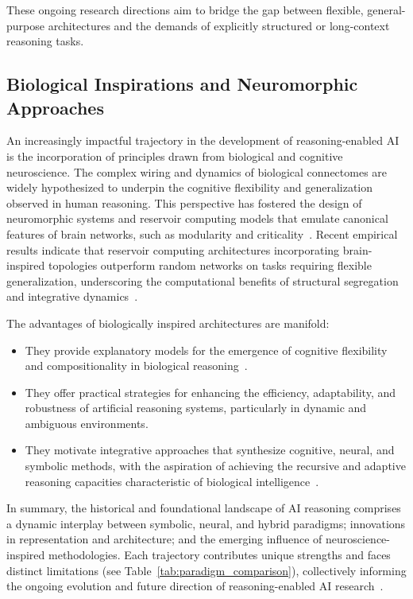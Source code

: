 \documentclass[sigconf]{acmart}
\begin{document}
These ongoing research directions aim to bridge the gap between flexible, general-purpose architectures and the demands of explicitly structured or long-context reasoning tasks.

\subsection{Biological Inspirations and Neuromorphic Approaches}

An increasingly impactful trajectory in the development of reasoning-enabled AI is the incorporation of principles drawn from biological and cognitive neuroscience. The complex wiring and dynamics of biological connectomes are widely hypothesized to underpin the cognitive flexibility and generalization observed in human reasoning. This perspective has fostered the design of neuromorphic systems and reservoir computing models that emulate canonical features of brain networks, such as modularity and criticality~\cite{ref90}. Recent empirical results indicate that reservoir computing architectures incorporating brain-inspired topologies outperform random networks on tasks requiring flexible generalization, underscoring the computational benefits of structural segregation and integrative dynamics~\cite{ref90}.

The advantages of biologically inspired architectures are manifold:

\begin{itemize}
    \item They provide explanatory models for the emergence of cognitive flexibility and compositionality in biological reasoning~\cite{ref90}.
    \item They offer practical strategies for enhancing the efficiency, adaptability, and robustness of artificial reasoning systems, particularly in dynamic and ambiguous environments.
    \item They motivate integrative approaches that synthesize cognitive, neural, and symbolic methods, with the aspiration of achieving the recursive and adaptive reasoning capacities characteristic of biological intelligence~\cite{ref49,ref90}.
\end{itemize}

In summary, the historical and foundational landscape of AI reasoning comprises a dynamic interplay between symbolic, neural, and hybrid paradigms; innovations in representation and architecture; and the emerging influence of neuroscience-inspired methodologies. Each trajectory contributes unique strengths and faces distinct limitations (see Table~\ref{tab:paradigm_comparison}), collectively informing the ongoing evolution and future direction of reasoning-enabled AI research~\cite{ref42,ref49,ref54,ref86,ref90,ref100}.
\end{document}

